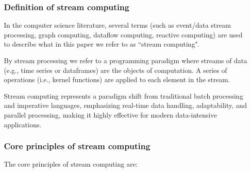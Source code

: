 \documentclass[11pt, reqno]{amsart}
\theoremstyle{definition}
\theoremstyle{remark}
\begin{document}
  \subsubsection{Definition of stream computing}

  In the computer science literature, several terms (such as event/data stream
  processing, graph computing, dataflow computing, reactive computing) are used
  to describe what in this paper we refer to as ``stream computing".

  By stream processing we refer to a programming paradigm where streams of data (e.g.,
  time series or dataframes) are the objects of computation. A series of
  operations (i.e., kernel functions) are applied to each element in the stream.

  Stream computing represents a paradigm shift from traditional batch processing
  and imperative languages, emphasizing real-time data handling, adaptability, and
  parallel processing, making it highly effective for modern data-intensive
  applications.

  \subsubsection{Core principles of stream computing}

  The core principles of stream computing are:
\end{document}
